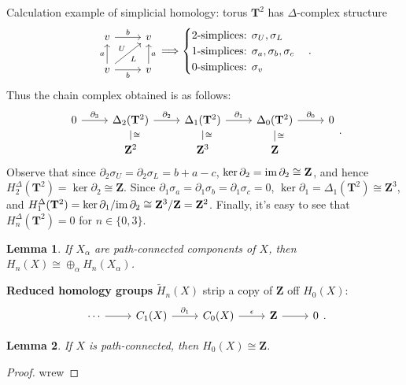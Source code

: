 \documentclass[11pt]{article}
\theoremstyle{definition}
\theoremstyle{plain}
\newtheorem*{lemma}{Lemma}
\theoremstyle{remark}
\newcommand{\im}{\textup{im}\,}
\newcommand{\Z}{\mathbf{Z}}
\begin{document}
Calculation example of simplicial homology: torus $\mathbf{T}^2$ has $\Delta$-complex structure
\[\begin{tikzcd}
v\arrow{r}{b}&v\\
v\arrow{u}{a}\arrow[swap]{r}{b}\arrow[ur,"U","L"']&v\arrow[swap]{u}{a}
\end{tikzcd}\Longrightarrow\begin{cases}
\textrm{2-simplices: }\sigma_U,\sigma_L\\
\textrm{1-simplices: }\sigma_a,\sigma_b,\sigma_c\\
\textrm{0-simplices: }\sigma_v
\end{cases}.\]
Thus the chain complex obtained is as follows:
\[\begin{tikzcd}[row sep=small]
0\arrow{r}{\partial_3}&\Delta_2(\mathbf{T}^2)\arrow[dash]{d}{\cong}\arrow{r}{\partial_2}&\Delta_1(\mathbf{T}^2)\arrow[dash]{d}{\cong}\arrow{r}{\partial_1}&\Delta_0(\mathbf{T}^2)\arrow{r}{\partial_0}\arrow[dash]{d}{\cong}&0\\
&\Z^2&\Z^3&\Z
\end{tikzcd}.\]
Observe that since $\partial_2\sigma_U=\partial_2\sigma_L=b+a-c$, $\ker\partial_2=\im\partial_2\cong\Z$, and hence
$H_2^\Delta(\mathbf{T}^2)=\ker\partial_2\cong\Z$. Since $\partial_1\sigma_a=\partial_1\sigma_b=\partial_1\sigma_c=0$, $\ker\partial_1=\Delta_1(\mathbf{T}^2)\cong\Z^3$, and $H_1^\Delta(\mathbf{T}^2)=\ker\partial_1/\im\partial_2\cong\Z^3/\Z=\Z^2$. Finally, it's easy to see that $H_n^\Delta(\mathbf{T}^2)=0$ for $n\in\{0,3\}$.

\begin{lemma}
If $X_\alpha$ are path-connected components of $X$, then $H_n(X)\cong\oplus_\alpha H_n(X_\alpha)$.
\end{lemma}

\textbf{Reduced homology groups} $\widetilde{H}_n(X)$ strip a copy of $\Z$ off $H_0(X)$:
\[\begin{tikzcd}
\cdots\arrow{r}&C_1(X)\arrow{r}{\partial_1}&C_0(X)\arrow{r}{\epsilon}&\Z\arrow[r]&0
\end{tikzcd}.\]

\begin{lemma}
If $X$ is path-connected, then $H_0(X)\cong\Z$.
\end{lemma}
\begin{proof}
wrew
\end{proof}
\end{document}
